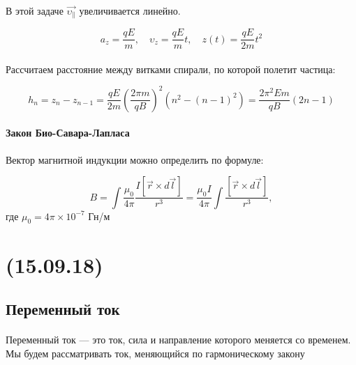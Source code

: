\documentclass[dvipdfmx]{article}
\begin{document}
\paragraph{}

В этой задаче $\vec{\upsilon_\parallel}$ увеличивается линейно.

\begin{equation*}
  a_z = \frac{qE}{m}, \quad \upsilon_z = \frac{qE}{m}t, \quad z(t) = \frac{qE}{2m}t^2
\end{equation*}

\paragraph{}

\newpage

Рассчитаем расстояние между витками спирали, по которой полетит частица:

\begin{equation*}
  h_n = z_n - z_{n-1} = \frac{qE}{2m}\left(\frac{2\pi m}{qB}\right)^2\left(n^2-(n-1)^2\right) = \frac{2\pi^2Em}{qB}(2n-1)
\end{equation*}

\paragraph{Закон Био-Савара-Лапласа} Вектор магнитной индукции можно определить по формуле:

\begin{equation*}
  B = \int \frac{\mu_0}{4\pi} \frac{ I[\vec{r} \times d \vec{l}] }{r^3} =
  \frac{\mu_0I}{4\pi}\int\frac{[\vec{r}\times d\vec{l}]}{r^3},
\end{equation*}
где $\mu_0 = 4\pi \times 10^{-7}$ Гн/м

\newpage
\noindent\makebox[\linewidth]{\rule{\paperwidth}{0.4pt}}
\section{(15.09.18)}
\noindent\makebox[\linewidth]{\rule{\paperwidth}{0.4pt}}

\subsection{Переменный ток}
\paragraph{}

Переменный ток --- это ток, сила и направление которого меняется со временем. Мы будем рассматривать
ток, меняющийся по гармоническому закону
\end{document}
